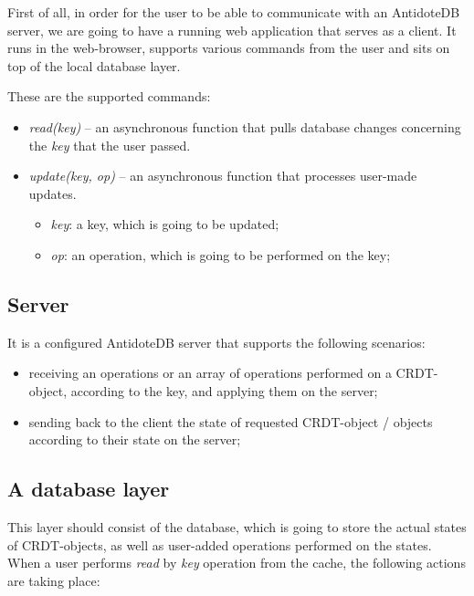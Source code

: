 First of all, in order for the user to be able to communicate with an AntidoteDB server, we are going to have a running web application that serves as a client. It runs in the web-browser, supports various commands from the user and sits on top of the local database layer. 

\vspace{5mm}These are the supported commands:

\begin{itemize}
    \item \textit{read(key)} -- an asynchronous function that pulls database changes concerning the \textit{key} that the user passed.
    \item \textit{update(key, op)}  -- an asynchronous function that processes user-made updates.
     \begin{itemize}
         \item \textit{key}: a key, which is going to be updated;
         \item \textit{op}: an operation, which is going to be performed on the key;
     \end{itemize}
  \end{itemize}

\subsection{Server}

It is a configured AntidoteDB server that supports the following scenarios:

\begin{itemize}
    \item receiving an operations or an array of operations performed on a CRDT-object, according to the key, and applying them on the server;
    \item sending back to the client the state of requested CRDT-object / objects according to their state on the server;
\end{itemize}

\subsection{A database layer}

This layer should consist of the database, which is going to store the actual states of CRDT-objects, as well as user-added operations performed on the states.
When a user performs \textit{read} by \textit{key} operation from the cache, the following actions are taking place:

